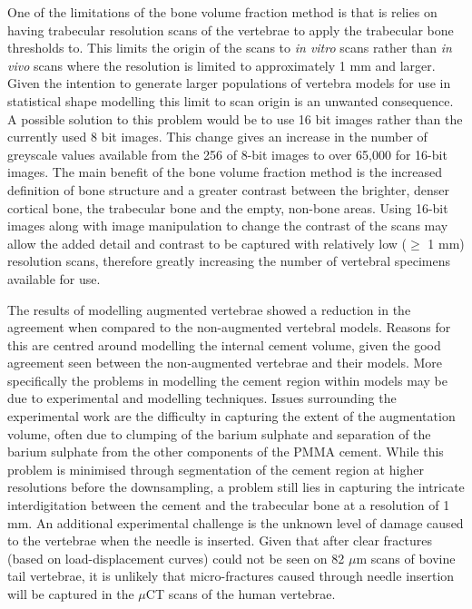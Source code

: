 One of the limitations of the bone volume fraction method is that is relies on having trabecular resolution scans of the vertebrae to apply the trabecular bone thresholds to.
This limits the origin of the scans to \textit{in vitro} scans rather than \textit{in vivo} scans where the resolution is limited to approximately 1 mm and larger.
Given the intention to generate larger populations of vertebra models for use in statistical shape modelling this limit to scan origin is an unwanted consequence.
A possible solution to this problem would be to use 16 bit images rather than the currently used 8 bit images.
This change gives an increase in the number of greyscale values available from the 256 of 8-bit images to over 65,000 for 16-bit images.
The main benefit of the bone volume fraction method is the increased definition of bone structure and a greater contrast between the brighter, denser cortical bone, the trabecular bone and the empty, non-bone areas.
Using 16-bit images along with image manipulation to change the contrast of the scans may allow the added detail and contrast to be captured with relatively low ($\geq$ 1 mm) resolution scans, therefore greatly increasing the number of vertebral specimens available for use.



The results of modelling augmented vertebrae showed a reduction in the agreement when compared to the non-augmented vertebral models.
Reasons for this are centred around modelling the internal cement volume, given the good agreement seen between the non-augmented vertebrae and their models.
More specifically the problems in modelling the cement region within models may be due to experimental and modelling techniques.
Issues surrounding the experimental work are the difficulty in capturing the extent of the augmentation volume, often due to clumping of the barium sulphate and separation of the barium sulphate from the other components of the PMMA cement.
While this problem is minimised through segmentation of the cement region at higher resolutions before the downsampling, a problem still lies in capturing the intricate interdigitation between the cement and the trabecular bone at a resolution of 1 mm.
An additional experimental challenge is the unknown level of damage caused to the vertebrae when the needle is inserted.
Given that after clear fractures (based on load-displacement curves) could not be seen on 82 $\mu$m scans of bovine tail vertebrae, it is unlikely that micro-fractures caused through needle insertion will be captured in the $\mu$CT scans of the human vertebrae.

